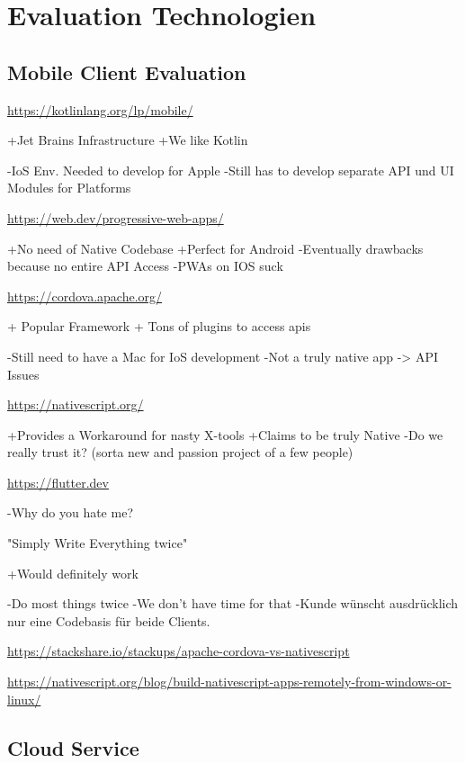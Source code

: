 \section{Evaluation Technologien}\label{sec:evaluation-technologien}

\subsection{Mobile Client Evaluation}\label{subsec:mobile-client-eval}



\url{https://kotlinlang.org/lp/mobile/}
	

    +Jet Brains Infrastructure 
    +We like Kotlin 

    -IoS Env. Needed to develop for Apple 
    -Still has to develop separate API und UI Modules for Platforms 

\url{https://web.dev/progressive-web-apps/ }
	
    +No need of Native Codebase
    +Perfect for Android 
    -Eventually drawbacks because no entire API Access 
    -PWAs on IOS suck

\url{https://cordova.apache.org/} 
	

    + Popular Framework 
    + Tons of plugins to access apis 

    -Still need to have a Mac for IoS development  
    -Not a truly native app -> API Issues
 

\url{https://nativescript.org/ }

    +Provides a Workaround for nasty X-tools 
    +Claims to be truly Native 
    -Do we really trust it? (sorta new and passion project of a few people) 

 
 \url{https://flutter.dev}

    -Why do you hate me?


"Simply Write Everything twice"

    +Would definitely work

    -Do most things twice
    -We don't have time for that
    -Kunde wünscht ausdrücklich nur eine Codebasis für beide Clients.

\url{https://stackshare.io/stackups/apache-cordova-vs-nativescript}

\url{https://nativescript.org/blog/build-nativescript-apps-remotely-from-windows-or-linux/ }

\subsection{Cloud Service}\label{subsec:cloud-service2}


